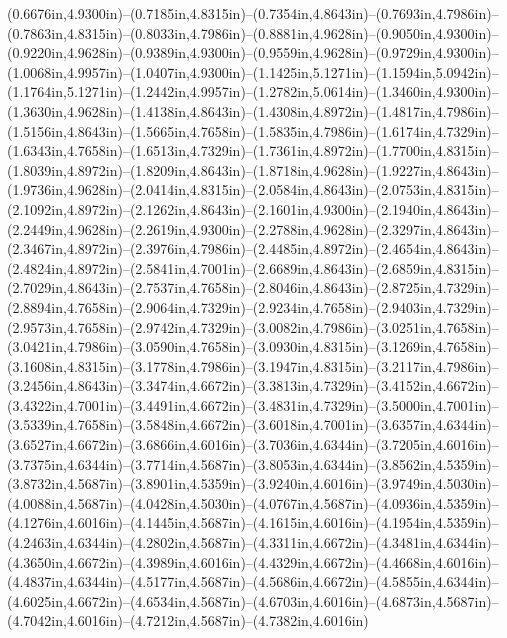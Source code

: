 (0.6676in,4.9300in)--(0.7185in,4.8315in)--(0.7354in,4.8643in)--(0.7693in,4.7986in)--(0.7863in,4.8315in)--(0.8033in,4.7986in)--(0.8881in,4.9628in)--(0.9050in,4.9300in)--(0.9220in,4.9628in)--(0.9389in,4.9300in)--(0.9559in,4.9628in)--(0.9729in,4.9300in)--(1.0068in,4.9957in)--(1.0407in,4.9300in)--(1.1425in,5.1271in)--(1.1594in,5.0942in)--(1.1764in,5.1271in)--(1.2442in,4.9957in)--(1.2782in,5.0614in)--(1.3460in,4.9300in)--(1.3630in,4.9628in)--(1.4138in,4.8643in)--(1.4308in,4.8972in)--(1.4817in,4.7986in)--(1.5156in,4.8643in)--(1.5665in,4.7658in)--(1.5835in,4.7986in)--(1.6174in,4.7329in)--(1.6343in,4.7658in)--(1.6513in,4.7329in)--(1.7361in,4.8972in)--(1.7700in,4.8315in)--(1.8039in,4.8972in)--(1.8209in,4.8643in)--(1.8718in,4.9628in)--(1.9227in,4.8643in)--(1.9736in,4.9628in)--(2.0414in,4.8315in)--(2.0584in,4.8643in)--(2.0753in,4.8315in)--(2.1092in,4.8972in)--(2.1262in,4.8643in)--(2.1601in,4.9300in)--(2.1940in,4.8643in)--(2.2449in,4.9628in)--(2.2619in,4.9300in)--(2.2788in,4.9628in)--(2.3297in,4.8643in)--(2.3467in,4.8972in)--(2.3976in,4.7986in)--(2.4485in,4.8972in)--(2.4654in,4.8643in)--(2.4824in,4.8972in)--(2.5841in,4.7001in)--(2.6689in,4.8643in)--(2.6859in,4.8315in)--(2.7029in,4.8643in)--(2.7537in,4.7658in)--(2.8046in,4.8643in)--(2.8725in,4.7329in)--(2.8894in,4.7658in)--(2.9064in,4.7329in)--(2.9234in,4.7658in)--(2.9403in,4.7329in)--(2.9573in,4.7658in)--(2.9742in,4.7329in)--(3.0082in,4.7986in)--(3.0251in,4.7658in)--(3.0421in,4.7986in)--(3.0590in,4.7658in)--(3.0930in,4.8315in)--(3.1269in,4.7658in)--(3.1608in,4.8315in)--(3.1778in,4.7986in)--(3.1947in,4.8315in)--(3.2117in,4.7986in)--(3.2456in,4.8643in)--(3.3474in,4.6672in)--(3.3813in,4.7329in)--(3.4152in,4.6672in)--(3.4322in,4.7001in)--(3.4491in,4.6672in)--(3.4831in,4.7329in)--(3.5000in,4.7001in)--(3.5339in,4.7658in)--(3.5848in,4.6672in)--(3.6018in,4.7001in)--(3.6357in,4.6344in)--(3.6527in,4.6672in)--(3.6866in,4.6016in)--(3.7036in,4.6344in)--(3.7205in,4.6016in)--(3.7375in,4.6344in)--(3.7714in,4.5687in)--(3.8053in,4.6344in)--(3.8562in,4.5359in)--(3.8732in,4.5687in)--(3.8901in,4.5359in)--(3.9240in,4.6016in)--(3.9749in,4.5030in)--(4.0088in,4.5687in)--(4.0428in,4.5030in)--(4.0767in,4.5687in)--(4.0936in,4.5359in)--(4.1276in,4.6016in)--(4.1445in,4.5687in)--(4.1615in,4.6016in)--(4.1954in,4.5359in)--(4.2463in,4.6344in)--(4.2802in,4.5687in)--(4.3311in,4.6672in)--(4.3481in,4.6344in)--(4.3650in,4.6672in)--(4.3989in,4.6016in)--(4.4329in,4.6672in)--(4.4668in,4.6016in)--(4.4837in,4.6344in)--(4.5177in,4.5687in)--(4.5686in,4.6672in)--(4.5855in,4.6344in)--(4.6025in,4.6672in)--(4.6534in,4.5687in)--(4.6703in,4.6016in)--(4.6873in,4.5687in)--(4.7042in,4.6016in)--(4.7212in,4.5687in)--(4.7382in,4.6016in)
